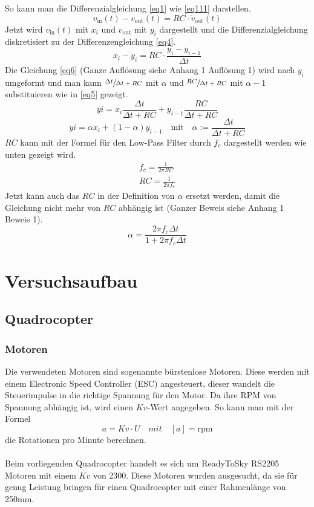 \documentclass[12pt,a4paper, ngerman]{article}
\begin{document}
So kann man die Differenzialgleichung \ref{eq1} wie \ref{eq111} darstellen.\\
\begin{equation} \label{eq111}
v_{\text{in}}(t)-v_{\text{out}}(t)=RC\cdot \dot{v}_{\text{out}}(t)
\end{equation}
Jetzt wird $v_{\text{in}}(t)$ mit $x_{i}$ und $v_{\text{out}}$ mit $y_{i}$ dargestellt und die Differenzialgleichung diskretisiert zu der Differenzengleichung \ref{eq4}.
\begin{equation}\label{eq4}
x_{i}-y_{i}=RC\cdot \frac{y_{i}-y_{i-1}}{\Delta t}
\end{equation}
\newpage
\noindent
Die Gleichung \ref{eq6} (Ganze Auflösung siehe Anhang 1 Auflösung 1) wird nach $y_{i}$ umgeformt und man kann $\sfrac{\Delta t}{\Delta t+RC}$  mit $\alpha$ und $\sfrac{RC}{\Delta t + RC}$ mit $\alpha-1$ substituieren wie in \ref{eq5} gezeigt.
\begin{equation} \label{eq6}
y{i}=x_{i}\frac{\Delta t}{\Delta t+RC} + y_{i-1}\frac{RC}{\Delta t+RC}
\end{equation} 
\begin{equation}\label{eq5}
y{i}=\alpha x_{i} + (1-\alpha)y_{i-1} \quad \text{mit} \quad \alpha:=\frac{\Delta t}{\Delta t+RC}
\end{equation}
$RC$ kann mit der Formel für den Low-Pass Filter durch $f_{c}$ dargestellt werden wie unten gezeigt wird.
\begin{align*}
f_{c} = \frac{1}{2\pi RC} \\
RC = \frac{1}{2\pi f_{c}} 
\end{align*}
Jetzt kann auch das $RC$ in der Definition von $\alpha$ ersetzt werden, damit die Gleichung nicht mehr von $RC$ abhängig ist (Ganzer Beweis siehe Anhang 1 Beweis 1).
\begin{equation*}
\alpha = \frac{2\pi f_{c}\Delta t}{1+2\pi f_{c}\Delta t} 
\end{equation*}
\newpage
\section{Versuchsaufbau}
\subsection{Quadrocopter}
\subsubsection{Motoren}
Die verwendeten Motoren sind sogenannte bürstenlose Motoren. Diese werden mit einem Electronic Speed Controller (ESC) angesteuert, dieser wandelt die Steuerimpulse in die richtige Spannung für den Motor. Da ihre RPM von Spannung abhängig ist, wird einen $Kv$-Wert angegeben. So kann man mit der Formel
\begin{equation}
a=Kv\cdot U \quad mit \quad [a]=\text{rpm}
\end{equation}
die Rotationen pro Minute berechnen.\\ \\
Beim vorliegenden Quadrocopter handelt es sich um ReadyToSky RS2205 Motoren mit einem $Kv$ von 2300. Diese Motoren wurden ausgesucht, da sie für genug Leistung bringen für einen Quadrocopter mit einer Rahmenlänge von 250mm.
\end{document}
